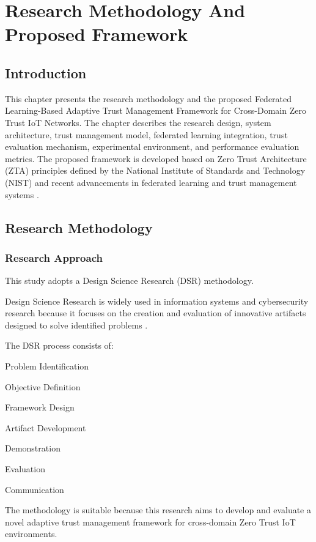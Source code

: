 \chapter{Research Methodology And Proposed Framework}

\section{Introduction}

This chapter presents the research methodology and the proposed Federated Learning-Based Adaptive Trust Management Framework for Cross-Domain Zero Trust IoT Networks. The chapter describes the research design, system architecture, trust management model, federated learning integration, trust evaluation mechanism, experimental environment, and performance evaluation metrics. The proposed framework is developed based on Zero Trust Architecture (ZTA) principles defined by the National Institute of Standards and Technology (NIST) and recent advancements in federated learning and trust management systems .


\section{Research Methodology}

\subsection{Research Approach}

This study adopts a Design Science Research (DSR) methodology.


Design Science Research is widely used in information systems and cybersecurity research because it focuses on the creation and evaluation of innovative artifacts designed to solve identified problems .


The DSR process consists of:


Problem Identification


Objective Definition


Framework Design


Artifact Development


Demonstration


Evaluation


Communication


The methodology is suitable because this research aims to develop and evaluate a novel adaptive trust management framework for cross-domain Zero Trust IoT environments.


